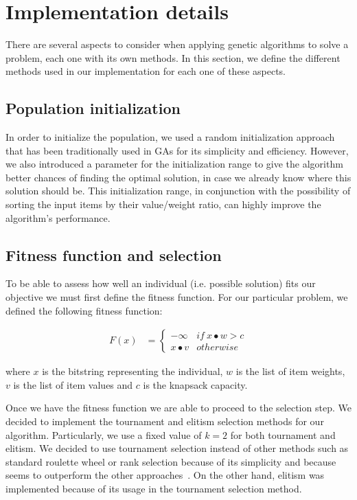 \documentclass[anon]{CI}
\begin{document}
\section{Implementation details}\label{sec:ci-methods}
There are several aspects to consider when applying genetic algorithms to solve a problem, each one with its own methods. In this section, we define the different methods used in our implementation for each one of these aspects.

\subsection{Population initialization}
In order to initialize the population, we used a random initialization approach that has been traditionally used in GAs for its simplicity and efficiency. However, we also introduced a parameter for the initialization range to give the algorithm better chances of finding the optimal solution, in case we already know where this solution should be. This initialization range, in conjunction with the possibility of sorting the input items by their value/weight ratio, can highly improve the algorithm's performance.

\subsection{Fitness function and selection}
To be able to assess how well an individual (i.e. possible solution) fits our objective we must first define the fitness function. For our particular problem, we defined the following fitness function:

\begin{align*}
F(x) & =\begin{cases}
-\infty & if\:x\bullet w>c\\
x\bullet v & otherwise
\end{cases}
\end{align*}

\noindent where $x$ is the bitstring representing the individual, $w$ is the list of item weights, $v$ is the list of item values and $c$ is the knapsack capacity.

Once we have the fitness function we are able to proceed to the selection step. We decided to implement the tournament and elitism selection methods for our algorithm. Particularly, we use a fixed value of $k=2$ for both tournament and elitism. We decided to use tournament selection instead of other methods such as standard roulette wheel or rank selection because of its simplicity and because seems to outperform the other approaches~\cite{razali2011genetic}. On the other hand, elitism was implemented because of its usage in the tournament selection method.
\end{document}
